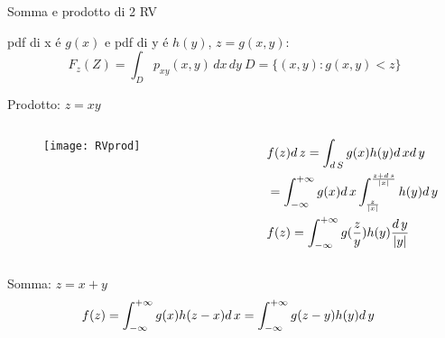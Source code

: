 \documentclass[asd-beamer.tex]{subfiles}
\begin{document}
\begin{frame}{Somma e prodotto di 2 RV}
\begin{block}{}
pdf di x \'e $g(x)$ e pdf di y \'e $h(y)$, $z=g(x,y)$:
\[F_z(Z)=\int_Dp_{xy}(x,y)\,dx\,dy\ D=\{(x,y):g(x,y)<z\}\]
\end{block}
\begin{block}{Prodotto: $z=xy$}
	\begin{columns}[T]
		\begin{column}{0.3\textwidth}
			\begin{figure}
				\centering
				\texttt{[image: RVprod]}
				\label{fig:RVprod}
			\end{figure}
		\end{column}
		\begin{column}{0.7\textwidth}
			\begin{align*}
			&f(z)d\,z=\int_{d\,S}g(x)h(y)d\,xd\,y\\
			&=\int_{-\infty}^{+\infty}{}g(x)d\,x\int_{\frac{z}{|x|}}^{\frac{z+d\,s}{|x|}}h(y)d\,y\\
			&f(z)=\int_{-\infty}^{+\infty}{}g(\frac{z}{y})h(y)\frac{d\,y}{|y|}
			\end{align*}
		\end{column}
	\end{columns}
\end{block}
\begin{block}{Somma: $z=x+y$}
	\begin{align*}
	&f(z)=\int_{-\infty}^{+\infty}{}g(x)h(z-x)d\,x=\int_{-\infty}^{+\infty}{}g(z-y)h(y)d\,y
	\end{align*}
\end{block}
\end{frame}
\end{document}
